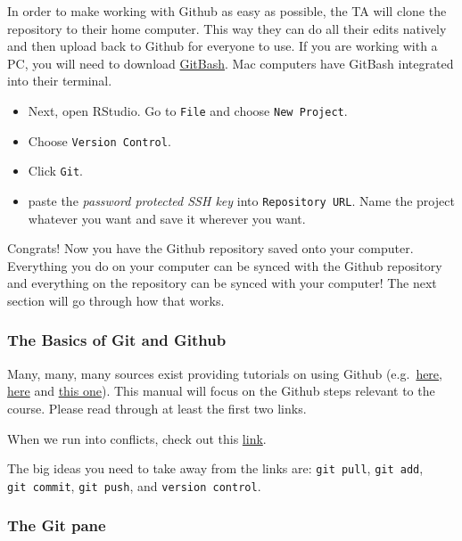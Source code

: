 \documentclass[
]{article}
\begin{document}
In order to make working with Github as easy as possible, the TA will
clone the repository to their home computer. This way they can do all
their edits natively and then upload back to Github for everyone to use.
If you are working with a PC, you will need to download
\href{https://gitforwindows.org}{GitBash}. Mac computers have GitBash
integrated into their terminal.

\begin{itemize}
\item
  Next, open RStudio. Go to \texttt{File} and choose
  \texttt{New\ Project}.
\item
  Choose \texttt{Version\ Control}.
\item
  Click \texttt{Git}.
\item
  paste the \emph{password protected SSH key} into
  \texttt{Repository\ URL}. Name the project whatever you want and save
  it wherever you want.
\end{itemize}

Congrats! Now you have the Github repository saved onto your computer.
Everything you do on your computer can be synced with the Github
repository and everything on the repository can be synced with your
computer! The next section will go through how that works.

\hypertarget{the-basics-of-git-and-github}{%
\subsubsection{The Basics of Git and
Github}\label{the-basics-of-git-and-github}}

Many, many, many sources exist providing tutorials on using Github
(e.g.~\href{https://happygitwithr.com}{here},
\href{http://r-pkgs.had.co.nz/git.html}{here} and
\href{https://towardsdatascience.com/getting-started-with-git-and-github-6fcd0f2d4ac6}{this
one}). This manual will focus on the Github steps relevant to the
course. Please read through at least the first two links.

When we run into conflicts, check out this
\href{https://medium.com/@RedRoxProjects/how-do-i-git-three-ways-to-solve-a-merge-conflict-cde4d7924c80}{link}.

The big ideas you need to take away from the links are:
\texttt{git\ pull}, \texttt{git\ add}, \texttt{git\ commit},
\texttt{git\ push}, and \texttt{version\ control}.

\hypertarget{the-git-pane}{%
\subsubsection{The Git pane}\label{the-git-pane}}
\end{document}
